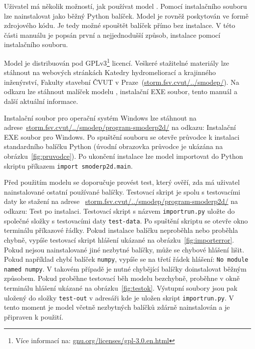   
  Uživatel má několik možností, jak používat model \smod. Pomocí instalačního souboru lze nainstalovat \smod jako běžný Python balíček. Model \smod je rovněž poskytován ve formě zdrojového kódu. Je tedy možné spouštět balíček přímo bez instalace. V této části manuálu je popsán první a nejjednodušší způsob, instalace pomocí instalačního souboru. 
  
  Model \smod je distribuován pod GPLv3\footnote{Více informací na: \href{https://www.gnu.org/licenses/gpl-3.0.en.html}{gnu.org/licenses/gpl-3.0.en.html}} licencí. Veškeré stažitelné materiály lze stáhnout na webových stránkách Katedry hydromeliorací a krajinného inženýrství, Fakulty stavební ČVUT v Praze~(\href{http://storm.fsv.cvut.cz/cinnost-katedry/volne-stazitelne-vysledky/smoderp/}{storm.fsv.cvut/../smodep/}). Na odkazu lze stáhnout malíček modelu \smod, instalační EXE soubor, tento manuál a další aktuální informace. 
  
  Instalační soubor pro operační systém Windows lze stáhnout na adrese~\href{http://storm.fsv.cvut.cz/cinnost-katedry/volne-stazitelne-vysledky/smoderp/program-smoderp2d/}{storm.fsv.cvut/../smodep/program-smoderp2d/} na odkazu: Instalační EXE soubor pro Windows. Po spuštění souboru se otevře průvodce k instalaci standardního balíčku Python (úvodní obrazovka průvodce je ukázána na obrázku~\ref{fig:pruvodce}). Po ukončení instalace lze model \smod importovat do Python skriptu příkazem {\tt import smoderp2d.main}. 

  Před použitím modelu se doporučuje provést test, který ověří, zda má uživatel nainstalované ostatní používané balíčky. Testovací skript je spolu s testovacími daty ke stažení na adrese ~\href{http://storm.fsv.cvut.cz/cinnost-katedry/volne-stazitelne-vysledky/smoderp/program-smoderp2d/}{storm.fsv.cvut/../smodep/program-smoderp2d/} na odkazu: Test po instalaci. Testovací skript s názvem {\tt importrun.py} uložte do společné složky s testovacími daty {\tt test-data}. Po spuštění skriptu se otevře okno terminálu příkazové řádky. Pokud instalace balíčku \smod neproběhla nebo proběhla chybně, vypíše testovací skript hlášení ukázané na obrázku~\ref{fig:importerror}. Pokud nejsou nainstalované jiné nezbytné balíčky, může se chybové hlášení lišit. Pokud například chybí balíček {\tt numpy}, vypíše se na třetí řádek hlášení: {\tt No module named numpy}. V takovém případě je nutné chybějící balíčky doinstalovat běžným způsobem. Pokud proběhne testovací běh modelu \smod bezchybně, proběhne v okně terminálu hlášení ukázané na obrázku~\ref{fig:testok}. Výstupní soubory jsou pak uložený do složky {\tt test-out} v adresáři kde je uložen skript {\tt importrun.py}. V tento moment je model \smod včetně nezbytných balíčků zdárně nainstalován a je připraven k použití.
  
